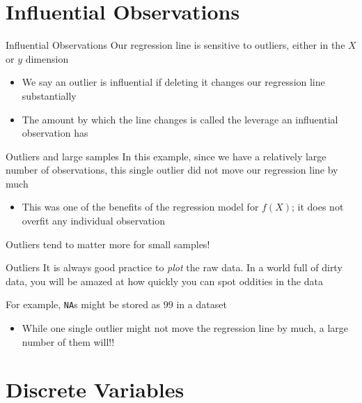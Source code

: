 \documentclass[aspectratio=169,t,11pt,table]{beamer}
\begin{document}
\section{Influential Observations}

\begin{frame}{Influential Observations}
  Our regression line is sensitive to \alert{outliers}, either in the $X$ or $y$ dimension 
  \begin{itemize}
    \item We say an outlier is \alert{influential} if deleting it changes our regression line substantially
    
    \item The amount by which the line changes is called the \alert{leverage} an influential observation has
  \end{itemize}
\end{frame}


\begin{frame}{Outliers and large samples}
  In this example, since we have a relatively large number of observations, this single outlier did not move our regression line by much
  \begin{itemize}
    \item This was one of the benefits of the regression model for $f(X)$; it does not overfit any individual observation
  \end{itemize}

  \bigskip
  Outliers tend to matter more for small samples!
\end{frame}

\begin{frame}{Outliers}
  It is always good practice to \emph{plot} the raw data. In a world full of dirty data, you will be amazed at how quickly you can spot oddities in the data

  \bigskip
  For example, \texttt{NA}s might be stored as $99$ in a dataset
  \begin{itemize}
    \item While one single outlier might not move the regression line by much, a large number of them will!!
  \end{itemize}
\end{frame}


\section{Discrete Variables}
\end{document}
